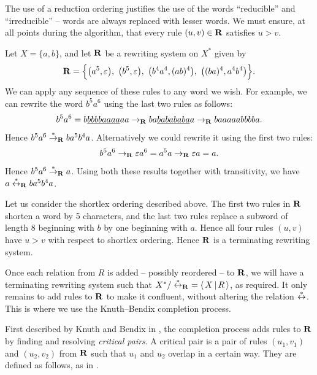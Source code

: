 The use of a reduction ordering justifies the use of the words ``reducible'' and
``irreducible'' -- words are always replaced with lesser words.  We must ensure,
at all points during the algorithm, that every rule $(u,v) \in \mathbf{R}$ satisfies
$u > v$.

\begin{example}
  \label{ex:rws}
  Let $X = \{a,b\}$, and let $\mathbf{R}$ be a rewriting system on $X^*$ given by
  $$\mathbf{R} = \Big\{
  \big(a^5, \varepsilon\big),
  \ \big(b^5, \varepsilon\big),
  \ \big(b^4a^4, (ab)^4\big),
  \ \big((ba)^4, a^4b^4\big)
  \Big\}.$$
  We can apply any sequence of these rules to any word we wish.  For example, we
  can rewrite the word $b^5a^6$ using the last two rules as follows:
  $$b^5a^6
  = b\underline{bbbbaaaa}aa
  \to_{\mathbf{R}} ba\underline{babababa}a
  \to_{\mathbf{R}} baaaaabbbba.$$
  Hence $b^5a^6 \stackrel{*}{\to}_{\mathbf{R}} ba^5b^4a$.  Alternatively we could rewrite it using
  the first two rules:
  $$b^5a^6
  \to_{\mathbf{R}} \varepsilon a^6
  = a^5a
  \to_{\mathbf{R}} \varepsilon a
  = a.$$
  Hence $b^5a^6 \stackrel{*}{\to}_{\mathbf{R}} a$.  Using both these results together with
  transitivity, we have $a \stackrel{*}{\leftrightarrow}_{\mathbf{R}} ba^5b^4a$.

  Let us consider the shortlex ordering described above.  The first two rules in
  $\mathbf{R}$ shorten a word by 5 characters, and the last two rules replace a
  subword of length 8 beginning with $b$ by one beginning with $a$.  Hence all
  four rules $(u,v)$ have $u > v$ with respect to shortlex ordering.  Hence
  $\mathbf{R}$ is a terminating rewriting system.
\end{example}

Once each relation from $R$ is added -- possibly reordered -- to $\mathbf{R}$, we
will have a terminating rewriting system such that
$X^* / \stackrel{*}{\leftrightarrow}_{\mathbf{R}}\ = \left\langle \, X \, \middle| \, R \, \right\rangle$, as required.  It only remains to add
rules to $\mathbf{R}$ to make it confluent, without altering the relation
$\stackrel{*}{\leftrightarrow}$.  This is where we use the Knuth--Bendix completion process.

First described by Knuth and Bendix in \cite{knuth_bendix}, the completion
process adds rules to $\mathbf{R}$ by finding and resolving
\textit{critical pairs}.  A critical pair is a pair of rules $(u_1, v_1)$ and
$(u_2, v_2)$ from $\mathbf{R}$ such that $u_1$ and $u_2$ overlap in a certain way.
They are defined as follows, as in \cite[Lemma 12.17]{cgt}.

